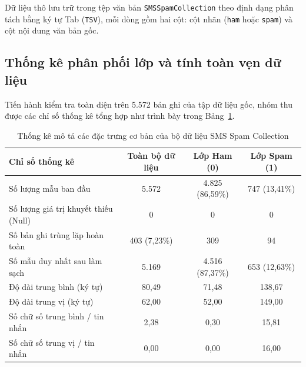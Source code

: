 \documentclass[12pt,a4paper]{report}
\begin{document}
Dữ liệu thô lưu trữ trong tệp văn bản \texttt{SMSSpamCollection} theo định dạng phân tách bằng ký tự Tab (\texttt{TSV}), mỗi dòng gồm hai cột: cột nhãn (\texttt{ham} hoặc \texttt{spam}) và cột nội dung văn bản gốc.

\subsection{Thống kê phân phối lớp và tính toàn vẹn dữ liệu}
Tiến hành kiểm tra toàn diện trên 5.572 bản ghi của tập dữ liệu gốc, nhóm thu được các chỉ số thống kê tổng hợp như trình bày trong Bảng~\ref{tab:eda_stats}.

\begin{table}[H]
    \centering
    \caption{Thống kê mô tả các đặc trưng cơ bản của bộ dữ liệu SMS Spam Collection}
    \label{tab:eda_stats}
    \begin{tabular}{lccc}
        \toprule
        \textbf{Chỉ số thống kê} & \textbf{Toàn bộ dữ liệu} & \textbf{Lớp Ham (0)} & \textbf{Lớp Spam (1)} \\
        \midrule
        Số lượng mẫu ban đầu & 5.572 & 4.825 (86,59\%) & 747 (13,41\%) \\
        Số lượng giá trị khuyết thiếu (Null) & 0 & 0 & 0 \\
        Số bản ghi trùng lặp hoàn toàn & 403 (7,23\%) & 309 & 94 \\
        Số mẫu duy nhất sau làm sạch & 5.169 & 4.516 (87,37\%) & 653 (12,63\%) \\
        Độ dài trung bình (ký tự) & 80,49 & 71,48 & 138,67 \\
        Độ dài trung vị (ký tự) & 62,00 & 52,00 & 149,00 \\
        Số chữ số trung bình / tin nhắn & 2,38 & 0,30 & 15,81 \\
        Số chữ số trung vị / tin nhắn & 0,00 & 0,00 & 16,00 \\
        \bottomrule
    \end{tabular}
\end{table}
\end{document}
